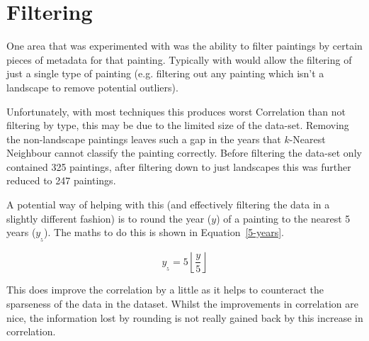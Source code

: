 \section{Filtering}
One area that was experimented with was the ability to filter paintings by certain pieces of 
metadata for that painting. Typically with would allow the filtering of just a single type of
painting (e.g. filtering out any painting which isn't a landscape to remove potential outliers).

Unfortunately, with most techniques this produces worst Correlation than not filtering by type,
this may be due to the limited size of the data-set. Removing the non-landscape 
paintings leaves such a gap in the years that $k$-Nearest Neighbour cannot classify the painting
correctly. Before filtering the data-set only contained 325 paintings, after filtering down to just
landscapes this was further reduced to 247 paintings.

A potential way of helping with this (and effectively filtering the data in a slightly different
fashion) is to round the year ($y$) of a painting to the nearest 5 years ($y_{_{5}}$). The maths 
to do this is shown in Equation~\ref{5-years}. 

\begin{equation}\label{5-years}
y_{_{5}} = 5\left\lfloor\frac{y}{5} \right\rfloor
\end{equation}

This does improve the correlation by a little as it helps to counteract the sparseness of the data
in the dataset. Whilst the improvements in correlation are nice, the information lost by rounding
is not really gained back by this increase in correlation.
